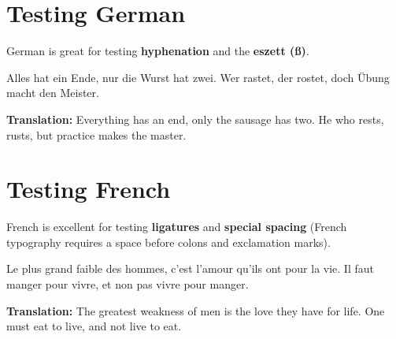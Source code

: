 \documentclass{article}
\begin{document}
	
	\section{Testing German}
	
	German is great for testing \textbf{hyphenation} and the \textbf{eszett (ß)}.
	
	Alles hat ein Ende, nur die Wurst hat zwei. Wer rastet, der rostet, doch Übung macht den Meister.
	
	\textbf{Translation:} Everything has an end, only the sausage has two. He who rests, rusts, but practice makes the master.
	
	\section{Testing French}
	
	French is excellent for testing \textbf{ligatures} and \textbf{special spacing} (French typography requires a space before colons and exclamation marks).
	
	Le plus grand faible des hommes, c'est l'amour qu'ils ont pour la vie. Il faut manger pour vivre, et non pas vivre pour manger.
	
	\textbf{Translation:} The greatest weakness of men is the love they have for life. One must eat to live, and not live to eat.
	
\end{document}
